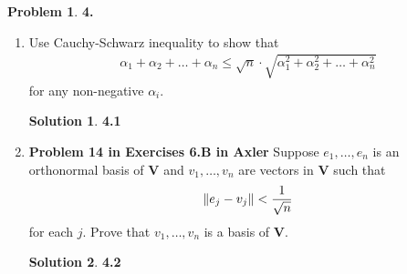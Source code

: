 \documentclass{article}
\theoremstyle{definition}
\newtheorem*{prob*}{Problem}
\newtheorem*{sln*}{Solution}
\newcommand{\V}{\mathbf{V}}
\begin{document}
\newpage





\begin{prob*}\textbf{4.}
	\begin{enumerate}
		\item Use Cauchy-Schwarz inequality to show that 
		\begin{align*}
		\alpha_1 + \alpha_2 + \dots + \alpha_n \leq 
		\sqrt{n}\cdot \sqrt{\alpha_1^2+ \alpha_2^2 + \dots + \alpha_n^2}
		\end{align*}
		for any non-negative $\alpha_i$.
		
		\begin{sln*}\textbf{4.1}
			
		\end{sln*}
	
	
		\newpage
		
		
		
		\item \textbf{Problem 14 in Exercises 6.B in Axler} Suppose $e_1,\dots,e_n$ is an orthonormal basis of $\V$ and $v_1,\dots,v_n$ are vectors in $\V$ such that
		\begin{align*}
		\norm{e_j - v_j } < \frac{1}{\sqrt{n}}
		\end{align*}
		for each $j$. Prove that $v_1,\dots,v_n$ is a basis of $\V$.
		
		\begin{sln*}\textbf{4.2}
			
		\end{sln*}
	\end{enumerate}
	
\end{prob*}




\newpage
\end{document}
